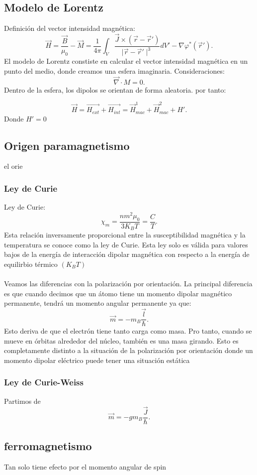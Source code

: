 \subsection{Modelo de Lorentz}
Definición del vector intensidad magnética:
\[
    \vec{H}= \frac{\vec{B}}{\mu_0}   - \vec{M} = \frac{1}{4\pi}\int_V \frac{\vec{J}\times \left( \vec{r}-\vec{r}' \right) }{ \mid \vec{r}- \vec{r}'  \mid ^3} dV' - \nabla  \varphi^* \left( \vec{r}' \right) 
.\] 
El modelo de Lorentz constiste en calcular el vector intensidad magnética en un punto del medio, donde creamos una esfera imaginaria. Consideraciones:
\[
    \vec{\nabla }\cdot M=0
.\] 
Dentro de la esfera, los dipolos se orientan de forma aleatoria. por tanto:

\[
    \vec{H}=\vec{H_{ext}}+ \vec{H_{int}}= \vec{H}_{mac}^1+ \vec{H}_{mac}^2+ H'
.\] 
Donde $H'=0$ 

\subsection{Origen paramagnetismo}
el orie

\subsubsection{Ley de Curie}
Ley de Curie:
\[
    \chi_{m}= \frac{nm^2\mu_0}{3K_BT}=\frac{C}{T}
.\] 
Esta relación inversamente proporcional entre la susceptibilidad magnética y la temperatura se conoce como la ley de Curie. Esta ley solo es válida para valores bajos de la energía de interacción dipolar magnética con respecto a la energía de equilirbio térmico $\left( K_{B}T \right) $\\
\\
Veamos las diferencias con la polarización por orientación. La principal diferencia es que cuando decimos que un átomo tiene un momento dipolar magnético permanente, tendrá un momento angular permanente ya que:
\[
 \vec{m}= -m_{B}\frac{\vec{l}}{\hbar }
.\] 
Esto deriva de que el electrón tiene tanto carga como masa. Pro tanto, cuando se mueve en órbitas alrededor del núcleo, también es una masa girando. Esto es completamente distinto a la situación de la polarización por orientación donde un momento dipolar eléctrico puede tener una situación estática
\subsubsection{Ley de Curie-Weiss}
Partimos de \[
\vec{m}= -g m_{B}\frac{\vec{J}}{\hbar }
.\] 
\subsection{ferromagnetismo}
Tan solo tiene efecto por el momento angular de spin

